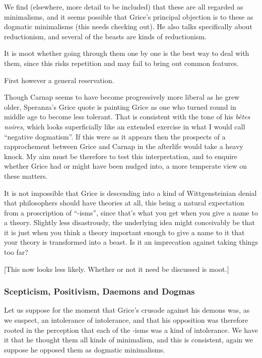 \documentclass[10pt,titlepage]{book}
\begin{document}
We find (elsewhere, more detail to be included) that these are all regarded as minimalisms, and it seems possible that Grice's principal objection is to these as dogmatic minimalisms (this needs checking out).
He also talks specifically about reductionism, and several of the beasts are kinds of reductionism.

It is moot whether going through them one by one is the best way to deal with them, since this risks repetition and may fail to bring out common features.

First however a general reservation.

Though Carnap seems to have become progressively more liberal as he grew older, Speranza's Grice quote is painting Grice as one who turned round in middle age to become less tolerant.
That is consistent with the tone of his {\it b\^etes noires}, which looks superficially like an extended exercise in what I would call ``negative dogmatism''.
If this were as it appears then the prospects of a rapprochement between Grice and Carnap in the afterlife would take a heavy knock.
My aim must be therefore to test this interpretation, and to enquire whether Grice had or might have been nudged into, a more temperate view on these matters. 

It is not impossible that Grice is descending into a kind of Wittgensteinian denial that philosophers should have theories at all, this being a natural expectation from a proscription of ``-isms'', since that's what you get when you give a name to a theory.
Slightly less disastrously, the underlying idea might conceivably be that it is just when you think a theory important enough to give a name to it that your theory is transformed into a beast.
Is it an imprecation against taking things too far?

[This now looks less likely.  Whether or not it need be discussed is moot.]

\subsubsection{Scepticism, Positivism, Daemons and Dogmas}

Let us suppose for the moment that Grice's crusade against his demons was, as we suspect, an intolerance of intolerance, and that his opposition was therefore rooted in the perception that each of the -isms was a kind of intolerance.
We have it that he thought them all kinds of minimalism, and this is consistent, again we suppose he opposed them as dogmatic minimalisms.
\end{document}
